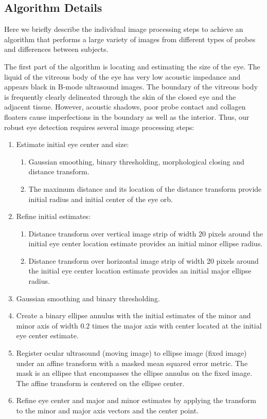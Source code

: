 \documentclass{llncs}
\begin{document}
\subsection{Algorithm Details}
Here we briefly describe the individual image processing steps to achieve an
algorithm that performs a large variety of images from different types of probes
and differences between subjects.

The first part of the algorithm is locating and estimating the size of the eye.
The liquid of the vitreous body of the eye has very low acoustic impedance and
appears black in B-mode ultrasound images. The boundary of the vitreous body is
frequently clearly delineated through the skin of the closed eye and the
adjacent tissue. However, acoustic shadows, poor probe contact and collagen
floaters cause imperfections in the boundary as well as the interior. Thus, our
robust eye detection requires several image processing steps: 
\begin{enumerate}
\item Estimate initial eye center and size:
  \begin{enumerate}
  \item Gaussian smoothing, binary thresholding, morphological closing and
          distance transform.
  \item The maximum distance and its location of the distance transform provide
        initial radius and initial center of the eye orb. 
  \end{enumerate}
\item Refine initial estimates:
  \begin{enumerate}
  \item Distance transform over vertical image strip of width 20 pixels
        around the initial eye center location estimate provides an initial
        minor ellipse radius.
  \item Distance transform over horizontal image strip of width 20 pixels 
        around the initial eye center location estimate provides an initial major
        ellipse radius.
  \end{enumerate}
\item Gaussian smoothing and binary thresholding.
\item Create a binary ellipse annulus with the initial estimates of the minor and
      minor axis of width $0.2$ times the major axis with center located at the
      initial eye center estimate.
\item Register ocular ultrasound (moving image) to ellipse image (fixed image)
      under an affine transform with a masked mean squared error metric. The
      mask is an ellipse that encompasses the ellipse annulus on the fixed
      image. The affine transform is centered on the ellipse center.
\item Refine eye center and major and minor estimates by applying the transform to
      the minor and major axis vectors and the center point.
\end{enumerate}
\end{document}
